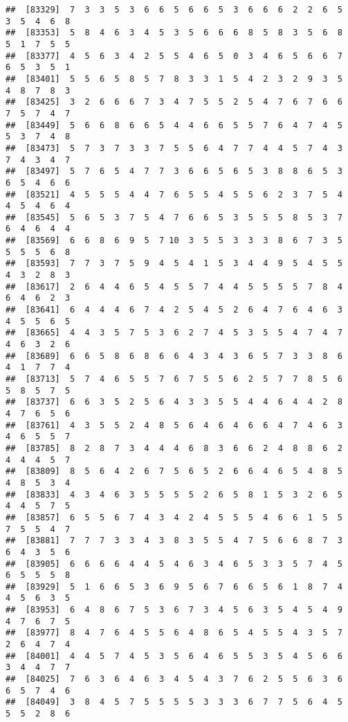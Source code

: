 \documentclass[
]{book}
\begin{document}
\begin{verbatim}
##  [83329]  7  3  3  5  3  6  6  5  6  6  5  3  6  6  6  2  2  6  5  3  5  4  6  8
##  [83353]  5  8  4  6  3  4  5  3  5  6  6  6  8  5  8  3  5  6  8  5  1  7  5  5
##  [83377]  4  5  6  3  4  2  5  5  4  6  5  0  3  4  6  5  6  6  7  6  5  3  5  1
##  [83401]  5  5  6  5  8  5  7  8  3  3  1  5  4  2  3  2  9  3  5  4  8  7  8  3
##  [83425]  3  2  6  6  6  7  3  4  7  5  5  2  5  4  7  6  7  6  6  7  5  7  4  7
##  [83449]  5  6  6  8  6  6  5  4  4  6  6  5  5  7  6  4  7  4  5  5  3  7  4  8
##  [83473]  5  7  3  7  3  3  7  5  5  6  4  7  7  4  4  5  7  4  3  7  4  3  4  7
##  [83497]  5  7  6  5  4  7  7  3  6  6  5  6  5  3  8  8  6  5  3  6  5  4  6  6
##  [83521]  4  5  5  5  4  4  7  6  5  5  4  5  5  6  2  3  7  5  4  4  5  4  6  4
##  [83545]  5  6  5  3  7  5  4  7  6  6  5  3  5  5  5  8  5  3  7  6  4  6  4  4
##  [83569]  6  6  8  6  9  5  7 10  3  5  5  3  3  3  8  6  7  3  5  5  5  5  6  8
##  [83593]  7  7  3  7  5  9  4  5  4  1  5  3  4  4  9  5  4  5  5  4  3  2  8  3
##  [83617]  2  6  4  4  6  5  4  5  5  7  4  4  5  5  5  5  7  8  4  6  4  6  2  3
##  [83641]  6  4  4  4  6  7  4  2  5  4  5  2  6  4  7  6  4  6  3  4  5  5  6  5
##  [83665]  4  4  3  5  7  5  3  6  2  7  4  5  3  5  5  4  7  4  7  4  6  3  2  6
##  [83689]  6  6  5  8  6  8  6  6  4  3  4  3  6  5  7  3  3  8  6  4  1  7  7  4
##  [83713]  5  7  4  6  5  5  7  6  7  5  5  6  2  5  7  7  8  5  6  5  8  5  7  5
##  [83737]  6  6  3  5  2  5  6  4  3  3  5  5  4  4  6  4  4  2  8  4  7  6  5  6
##  [83761]  4  3  5  5  2  4  8  5  6  4  6  4  6  6  4  7  4  6  3  4  6  5  5  7
##  [83785]  8  2  8  7  3  4  4  4  6  8  3  6  6  2  4  8  8  6  2  4  4  4  5  7
##  [83809]  8  5  6  4  2  6  7  5  6  5  2  6  6  4  6  5  4  8  5  4  8  5  3  4
##  [83833]  4  3  4  6  3  5  5  5  5  2  6  5  8  1  5  3  2  6  5  4  4  5  7  5
##  [83857]  6  5  5  6  7  4  3  4  2  4  5  5  5  4  6  6  1  5  5  7  5  5  4  7
##  [83881]  7  7  7  3  3  4  3  8  3  5  5  4  7  5  6  6  8  7  3  6  4  3  5  6
##  [83905]  6  6  6  6  4  4  5  4  6  3  4  6  5  3  3  5  7  4  5  6  5  5  5  8
##  [83929]  5  1  6  6  5  3  6  9  5  6  7  6  6  5  6  1  8  7  4  4  5  6  3  5
##  [83953]  6  4  8  6  7  5  3  6  7  3  4  5  6  3  5  4  5  4  9  4  7  6  7  5
##  [83977]  8  4  7  6  4  5  5  6  4  8  6  5  4  5  5  4  3  5  7  2  6  4  7  4
##  [84001]  4  4  5  7  4  5  3  5  6  4  6  5  5  3  5  4  5  6  6  3  4  4  7  7
##  [84025]  7  6  3  6  4  6  3  4  5  4  3  7  6  2  5  5  6  3  6  6  5  7  4  6
##  [84049]  3  8  4  5  7  5  5  5  5  3  3  3  6  7  7  5  6  4  5  5  5  2  8  6

\end{verbatim}
\end{document}
